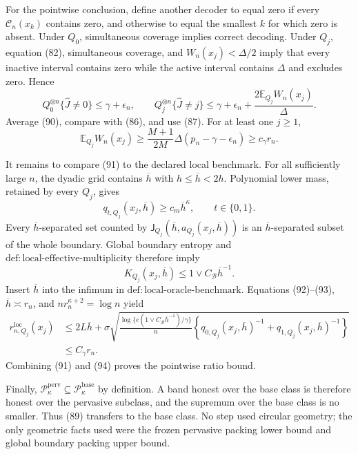 For the pointwise conclusion, define another decoder to equal zero if every \(\mathcal C_n(x_k)\) contains zero, and otherwise to equal the smallest \(k\) for which zero is absent. Under \(Q_0\), simultaneous coverage implies correct decoding. Under \(Q_j\), equation (82), simultaneous coverage, and \(W_n(x_j)<\Delta/2\) imply that every inactive interval contains zero while the active interval contains \(\Delta\) and excludes zero. Hence
\[
 Q_0^{\otimes n}\{\widehat J\ne0\}\le\gamma+\epsilon_n,
 \qquad
 Q_j^{\otimes n}\{\widehat J\ne j\}
 \le\gamma+\epsilon_n+\frac{2\mathbb E_{Q_j}W_n(x_j)}\Delta. \tag{90}
\]
Average (90), compare with (86), and use (87). For at least one \(j\ge1\),
\[
 \mathbb E_{Q_j}W_n(x_j)
 \ge \frac{M+1}{2M}\Delta(p_n-\gamma-\epsilon_n)
 \ge c_\gamma r_n. \tag{91}
\]

It remains to compare (91) to the declared local benchmark. For all sufficiently large \(n\), the dyadic grid contains \(\overline h\) with \(h\le\overline h<2h\). Polynomial lower mass, retained by every \(Q_j\), gives
\[
 q_{t,Q_j}(x_j,\overline h)\ge c_m\overline h^\kappa,
 \qquad t\in\{0,1\}. \tag{92}
\]
Every \(\overline h\)-separated set counted by \(\mathsf J_{Q_j}(\overline h,a_{Q_j}(x_j,\overline h))\) is an \(\overline h\)-separated subset of the whole boundary. Global boundary entropy and \(\mathrm{def:local\text{-}effective\text{-}multiplicity}\) therefore imply
\[
 K_{Q_j}(x_j,\overline h)\le1\vee C_{\mathcal B}\overline h^{-1}. \tag{93}
\]
Insert \(\overline h\) into the infimum in \(\mathrm{def:local\text{-}oracle\text{-}benchmark}\). Equations (92)--(93), \(\overline h\asymp r_n\), and \(nr_n^{\kappa+2}=\log n\) yield
\[
 \begin{aligned}
 r_{n,Q_j}^{\mathrm{loc}}(x_j)
 &\le2L\overline h+
 \sigma\sqrt{\frac{\log\{e(1\vee C_{\mathcal B}\overline h^{-1})/\gamma\}}n
 \left\{q_{0,Q_j}(x_j,\overline h)^{-1}
       +q_{1,Q_j}(x_j,\overline h)^{-1}\right\}}\\
 &\le C_\gamma r_n.
 \end{aligned} \tag{94}
\]
Combining (91) and (94) proves the pointwise ratio bound.

Finally, \(\mathcal P_{\kappa}^{\mathrm{perv}}\subseteq\mathcal P_{\kappa}^{\mathrm{base}}\) by definition. A band honest over the base class is therefore honest over the pervasive subclass, and the supremum over the base class is no smaller. Thus (89) transfers to the base class. No step used circular geometry; the only geometric facts used were the frozen pervasive packing lower bound and global boundary packing upper bound.